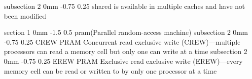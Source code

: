 \documentclass[a4paper,11pt]{article}
\makeatletter
\renewcommand{\section}{\@startsection
   {section}%
   {1}%
   {0mm}%
   {-1.5\baselineskip}%
   {0.5\baselineskip}%
   {\sffamily\bfseries\upshape\normalsize}}%
\renewcommand{\subsection}{\@startsection
   {subsection}%
   {2}%
   {0mm}%
   {-0.75\baselineskip}%
   {0.25\baselineskip}%
   {\rmfamily\normalfont\slshape\normalsize}}%
\makeatother
\begin{document}
\subsection{shared}
is available in multiple caches and have not been modified

\section{pram(Parallel random-access machine)}
\subsection{CREW PRAM}
Concurrent read exclusive write (CREW)—multiple processors can read a memory cell but only one can write at a time
\subsection{EREW PRAM}
Exclusive read exclusive write (EREW)—every memory cell can be read or written to by only one processor at a time
\end{document}
